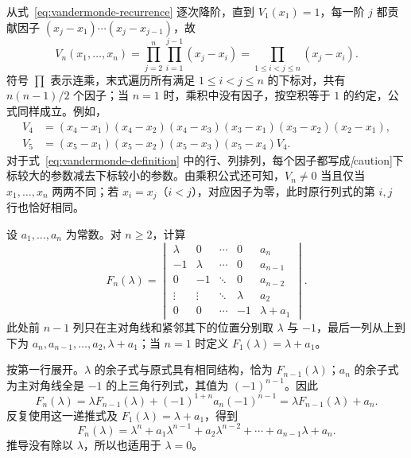 \begin{solve}
从式~\eqref{eq:vandermonde-recurrence} 逐次降阶，直到 $V_1(x_1)=1$，每一阶 $j$ 都贡献因子 $(x_j-x_1)\cdots(x_j-x_{j-1})$，故
\begin{equation}
\label{eq:vandermonde-product}
    V_n(x_1,\ldots,x_n)
    =\prod_{j=2}^{n}\prod_{i=1}^{j-1}(x_j-x_i)
    =\prod_{1\leq i<j\leq n}(x_j-x_i).
\end{equation}
符号 $\prod$ 表示连乘，末式遍历所有满足 $1\leq i<j\leq n$ 的下标对，共有 $n(n-1)/2$ 个因子；当 $n=1$ 时，乘积中没有因子，按空积等于 $1$ 的约定，公式同样成立。例如，
\[
    \begin{aligned}
        V_4&=(x_4-x_1)(x_4-x_2)(x_4-x_3)
              (x_3-x_1)(x_3-x_2)(x_2-x_1),\\
        V_5&=(x_5-x_1)(x_5-x_2)(x_5-x_3)(x_5-x_4)V_4.
    \end{aligned}
\]
对于式~\eqref{eq:vandermonde-definition} 中的行、列排列，每个因子都写成\emph[caution]{下标较大的参数减去下标较小的参数}。由乘积公式还可知，$V_n\ne 0$ 当且仅当 $x_1,\ldots,x_n$ 两两不同；若 $x_i=x_j$（$i<j$），对应因子为零，此时原行列式的第 $i,j$ 行也恰好相同。
\end{solve}


\begin{example}
\label{ex:determinant-polynomial-recurrence}
设 $a_1,\ldots,a_n$ 为常数。对 $n\geq2$，计算
\[
    F_n(\lambda)=\begin{vmatrix}
        \lambda&0&\cdots&0&a_n\\
        -1&\lambda&\cdots&0&a_{n-1}\\
        0&-1&\ddots&0&a_{n-2}\\
        \vdots&\vdots&\ddots&\lambda&a_2\\
        0&0&\cdots&-1&\lambda+a_1
    \end{vmatrix}.
\]
此处前 $n-1$ 列只在主对角线和紧邻其下的位置分别取 $\lambda$ 与 $-1$，最后一列从上到下为 $a_n,a_{n-1},\ldots,a_2,\lambda+a_1$；当 $n=1$ 时定义 $F_1(\lambda)=\lambda+a_1$。
\end{example}
\begin{solve}
按第一行展开。$\lambda$ 的余子式与原式具有相同结构，恰为 $F_{n-1}(\lambda)$；$a_n$ 的余子式为主对角线全是 $-1$ 的上三角行列式，其值为 $(-1)^{n-1}$。因此
\[
    F_n(\lambda)=\lambda F_{n-1}(\lambda)
      +(-1)^{1+n}a_n(-1)^{n-1}
      =\lambda F_{n-1}(\lambda)+a_n.
\]
反复使用这一递推式及 $F_1(\lambda)=\lambda+a_1$，得到
\[
    F_n(\lambda)=\lambda^n+a_1\lambda^{n-1}
       +a_2\lambda^{n-2}+\cdots+a_{n-1}\lambda+a_n.
\]
推导没有除以 $\lambda$，所以也适用于 $\lambda=0$。
\end{solve}

